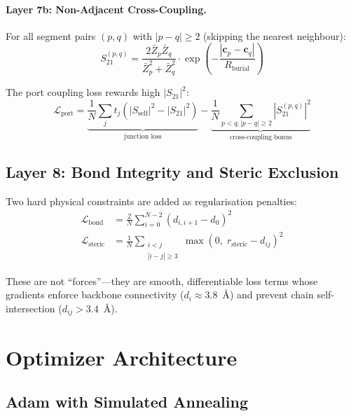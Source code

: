 \paragraph{Layer 7b: Non-Adjacent Cross-Coupling.}
For all segment pairs $(p, q)$ with $|p - q| \geq 2$ (skipping the nearest neighbour):
\begin{equation}
    S_{21}^{(p,q)} = \frac{2\bar{Z}_p \bar{Z}_q}{\bar{Z}_p^2 + \bar{Z}_q^2} \cdot \exp\!\left(-\frac{|\mathbf{c}_p - \mathbf{c}_q|}{R_\text{burial}}\right)
    \label{eq:cross_s21}
\end{equation}

The port coupling loss rewards high $|S_{21}|^2$:
\begin{equation}
    \mathcal{L}_\text{port} = \underbrace{\frac{1}{N}\sum_j t_j(|S_\text{self}|^2 - |S_{21}|^2)}_{\text{junction loss}} - \underbrace{\frac{1}{N}\sum_{p<q, |p-q|\geq 2} |S_{21}^{(p,q)}|^2}_{\text{cross-coupling bonus}}
    \label{eq:port_loss}
\end{equation}

\subsection{Layer 8: Bond Integrity and Steric Exclusion}

Two hard physical constraints are added as regularisation penalties:
\begin{align}
    \mathcal{L}_\text{bond}    &= \frac{2}{N} \sum_{i=0}^{N-2} (d_{i,i+1} - d_0)^2 \label{eq:bond_penalty} \\
    \mathcal{L}_\text{steric}  &= \frac{1}{N} \sum_{\substack{i < j \\ |i-j| \geq 3}} \max(0,\; r_\text{steric} - d_{ij})^2 \label{eq:steric_penalty}
\end{align}

These are not ``forces''---they are smooth, differentiable loss terms whose gradients enforce backbone connectivity ($d_i \approx 3.8$~\AA) and prevent chain self-intersection ($d_{ij} > 3.4$~\AA).

\section{Optimizer Architecture}

\subsection{Adam with Simulated Annealing}

